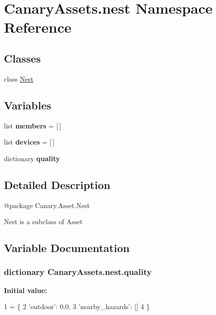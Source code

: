 \hypertarget{namespace_canary_assets_1_1nest}{\section{Canary\-Assets.\-nest Namespace Reference}
\label{namespace_canary_assets_1_1nest}
}
\subsection*{Classes}
\begin{DoxyCompactItemize}
\item 
class \hyperlink{class_canary_assets_1_1nest_1_1_nest}{Nest}
\end{DoxyCompactItemize}
\subsection*{Variables}
\begin{DoxyCompactItemize}
\item 
\hypertarget{namespace_canary_assets_1_1nest_abf8d58e778f2d696a9e4037c9d708daf}{list {\bfseries members} = \mbox{[}$\,$\mbox{]}}\label{namespace_canary_assets_1_1nest_abf8d58e778f2d696a9e4037c9d708daf}

\item 
\hypertarget{namespace_canary_assets_1_1nest_a38261c9c01dc4ce9d81474fc76040b8c}{list {\bfseries devices} = \mbox{[}$\,$\mbox{]}}\label{namespace_canary_assets_1_1nest_a38261c9c01dc4ce9d81474fc76040b8c}

\item 
dictionary {\bfseries quality}
\end{DoxyCompactItemize}


\subsection{Detailed Description}
\begin{DoxyVerb}@package Canary.Asset.Nest

Nest is a subclass of Asset
\end{DoxyVerb}
 

\subsection{Variable Documentation}
\hypertarget{namespace_canary_assets_1_1nest_a11334ebf9c8cdab2d6282fc552efdb06}{
\subsubsection[{quality}]{\setlength{\rightskip}{0pt plus 5cm}dictionary Canary\-Assets.\-nest.\-quality}}\label{namespace_canary_assets_1_1nest_a11334ebf9c8cdab2d6282fc552efdb06}
{\bfseries Initial value\-:}
\begin{DoxyCode}
1 = \{
2     \textcolor{stringliteral}{'outdoor'}: 0.0,
3     \textcolor{stringliteral}{'nearby\_hazards'}: []
4 \}
\end{DoxyCode}
